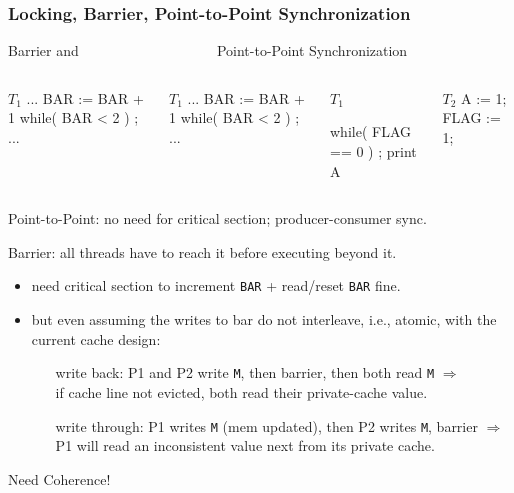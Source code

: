 \documentclass{beamer}
\renewcommand{\emph}[1]{\textcolor{structure}{#1}}
\newcommand{\emp}[1]{\textcolor{DikuRed}{ #1}}
\newcommand{\mymath}[1]{$ #1 $}
\newcommand{\myindx}[1]{_{#1}}
\begin{document}
\begin{frame}[fragile,t]
\frametitle{Locking, Barrier, Point-to-Point Synchronization}

\begin{block}{Barrier and {\tt~~~~~~~~~~~~~~~~~~} Point-to-Point Synchronization}
\begin{columns}
\begin{colorcode}[fontsize=\scriptsize]
\mymath{T\myindx{1}}
...
BAR := BAR + 1 
while( BAR < 2 ) ;
...
\end{colorcode} 
\begin{colorcode}[fontsize=\scriptsize]
\mymath{T\myindx{1}}
...
BAR := BAR + 1 
while( BAR < 2 ) ;
...
\end{colorcode} 
\begin{colorcode}[fontsize=\scriptsize]
\mymath{T\myindx{1}}


while( FLAG == 0 ) ;
print A
\end{colorcode} 
\begin{colorcode}[fontsize=\scriptsize]
\mymath{T\myindx{2}}
A    := 1;
FLAG := 1;


\end{colorcode} 
\end{columns}
\end{block}
\medskip

\emp{Point-to-Point}: no need for critical section; producer-consumer sync.
\medskip

\emp{Barrier}: all threads have to reach it before executing beyond it.
\begin{itemize}
    \item \alert{need critical section to increment {\tt BAR}} + \emph{read/reset {\tt BAR} fine}.
    \item but even assuming the writes to bar do not interleave, i.e., atomic,
            with the current cache design:\pause
    \begin{itemize}
    \item[write back:] P1 and P2 write {\tt M}, then barrier, then both
        read {\tt M} $\Rightarrow$\\
        if cache line not evicted, both read their private-cache value.\smallskip
    \item[write through:] P1 writes {\tt M} (mem updated), then P2 writes {\tt M}, barrier 
        $\Rightarrow$\\P1 will read an inconsistent value next from its private cache.
    \end  {itemize}
\end  {itemize}

\alert{Need Coherence!}

\end{frame}
\end{document}
